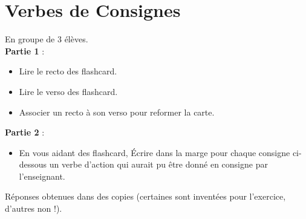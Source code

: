 \documentclass[12pt,a4paper,oneside,dvipsnames,table,svgnames,skins,theorems]{report}
\author{Rentrée 2}
\begin{document}
\chapter{Verbes de Consignes}

\begin{objectifs}

En groupe de 3 élèves.\\
\textbf{Partie 1} :
\begin{itemize}
\item Lire le recto des flashcard.
\item Lire le verso des flashcard.
\item Associer un recto à son verso pour reformer la carte.
\end{itemize}
\textbf{Partie 2} :
\begin{itemize}
\item En vous aidant des flashcard, Écrire dans la marge pour chaque consigne ci-dessous un verbe d'action qui aurait pu être donné en consigne par l'enseignant.
\end{itemize}

\end{objectifs}


Réponses obtenues dans des copies (certaines sont inventées pour l'exercice, d'autres non !).
\vspace{0.2cm}
\end{document}
